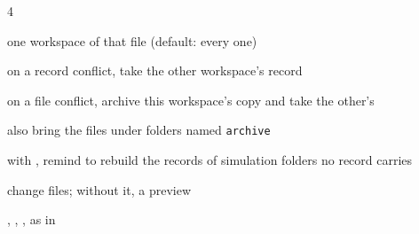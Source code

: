 \begin{multicols}{4}
\begin{flags}
\end{flags}
\begin{flags}
\item {} one workspace of that file (default: every one)
\item {} on a record conflict, take the other workspace's record
\item {} on a file conflict, archive this workspace's copy and take the other's
\item {} also bring the files under folders named \texttt{archive}
\item {} with , remind to rebuild the records of simulation folders no record carries
\item {} change files; without it, a preview
\item {}, , ,  as in 
\end{flags}
\end{multicols}
